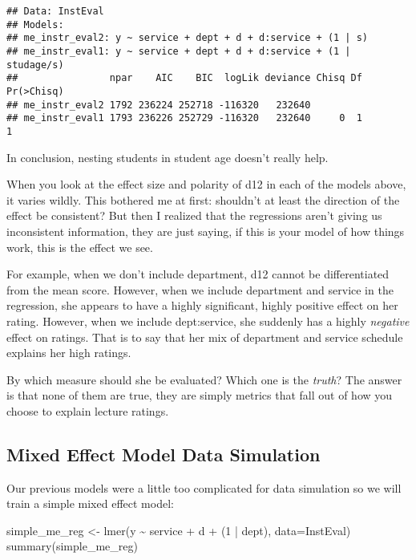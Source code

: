 \documentclass[
]{article}
\newenvironment{Shaded}{\begin{snugshade}}{\end{snugshade}}
\newcommand{\AttributeTok}[1]{\textcolor[rgb]{0.77,0.63,0.00}{#1}}
\newcommand{\DecValTok}[1]{\textcolor[rgb]{0.00,0.00,0.81}{#1}}
\newcommand{\FunctionTok}[1]{\textcolor[rgb]{0.00,0.00,0.00}{#1}}
\newcommand{\NormalTok}[1]{#1}
\newcommand{\OtherTok}[1]{\textcolor[rgb]{0.56,0.35,0.01}{#1}}
\newcommand{\SpecialCharTok}[1]{\textcolor[rgb]{0.00,0.00,0.00}{#1}}
\begin{document}
\begin{verbatim}
## Data: InstEval
## Models:
## me_instr_eval2: y ~ service + dept + d + d:service + (1 | s)
## me_instr_eval1: y ~ service + dept + d + d:service + (1 | studage/s)
##                npar    AIC    BIC  logLik deviance Chisq Df Pr(>Chisq)
## me_instr_eval2 1792 236224 252718 -116320   232640                    
## me_instr_eval1 1793 236226 252729 -116320   232640     0  1          1
\end{verbatim}

In conclusion, nesting students in student age doesn't really help.

When you look at the effect size and polarity of d12 in each of the
models above, it varies wildly. This bothered me at first: shouldn't at
least the direction of the effect be consistent? But then I realized
that the regressions aren't giving us inconsistent information, they are
just saying, if this is your model of how things work, this is the
effect we see.

For example, when we don't include department, d12 cannot be
differentiated from the mean score. However, when we include department
and service in the regression, she appears to have a highly significant,
highly positive effect on her rating. However, when we include
dept:service, she suddenly has a highly \emph{negative} effect on
ratings. That is to say that her mix of department and service schedule
explains her high ratings.

By which measure should she be evaluated? Which one is the \emph{truth}?
The answer is that none of them are true, they are simply metrics that
fall out of how you choose to explain lecture ratings.

\hypertarget{mixed-effect-model-data-simulation}{%
\subsection{Mixed Effect Model Data
Simulation}\label{mixed-effect-model-data-simulation}}

Our previous models were a little too complicated for data simulation so
we will train a simple mixed effect model:

\begin{Shaded}
\begin{Highlighting}[]
\NormalTok{simple\_me\_reg }\OtherTok{\textless{}{-}} \FunctionTok{lmer}\NormalTok{(y }\SpecialCharTok{\textasciitilde{}}\NormalTok{ service }\SpecialCharTok{+}\NormalTok{ d }\SpecialCharTok{+}\NormalTok{ (}\DecValTok{1} \SpecialCharTok{|}\NormalTok{ dept), }\AttributeTok{data=}\NormalTok{InstEval)}
\FunctionTok{summary}\NormalTok{(simple\_me\_reg)}
\end{Highlighting}
\end{Shaded}
\end{document}
